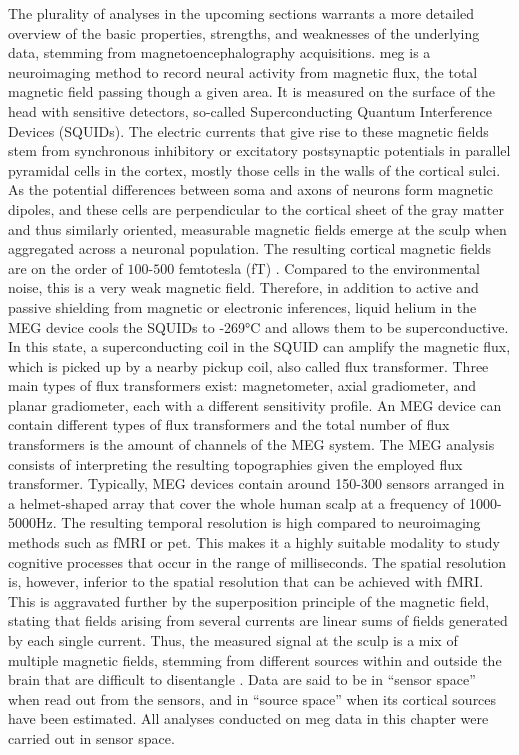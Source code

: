 The plurality of analyses in the upcoming sections warrants a more detailed overview of the basic properties, strengths, and weaknesses of the underlying data, stemming from magnetoencephalography acquisitions.
\gls{meg} is a neuroimaging method to record neural activity from magnetic flux, the total magnetic field passing though a given area.
It is measured on the surface of the head with sensitive detectors, so-called Superconducting Quantum Interference Devices (SQUIDs).
The electric currents that give rise to these magnetic fields stem from synchronous inhibitory or excitatory postsynaptic potentials in parallel pyramidal cells in the cortex, mostly those cells in the walls of the cortical sulci.
As the potential differences between soma and axons of neurons form magnetic dipoles, and these cells are perpendicular to the cortical sheet of the gray matter and thus similarly oriented, measurable magnetic fields emerge at the sculp when aggregated across a neuronal population.
The resulting cortical magnetic fields are on the order of $100$-$500$ femtotesla (fT) \citep{hari2017primer}.
Compared to the environmental noise, this is a very weak magnetic field.
Therefore, in addition to active and passive shielding from magnetic or electronic inferences, liquid helium in the MEG device cools the SQUIDs to -269°C and allows them to be superconductive.
In this state, a superconducting coil in the SQUID can amplify the magnetic flux, which is picked up by a nearby pickup coil, also called flux transformer.
Three main types of flux transformers exist: magnetometer, axial gradiometer, and planar gradiometer, each with a different sensitivity profile.
An MEG device can contain different types of flux transformers and the total number of flux transformers is the amount of channels of the MEG system.
The MEG analysis consists of interpreting the resulting topographies given the employed flux transformer.
Typically, MEG devices contain around 150-300 sensors arranged in a helmet-shaped array that cover the whole human scalp at a frequency of 1000-5000Hz.
The resulting temporal resolution is high compared to neuroimaging methods such as \gls{fMRI} or \gls{pet}.
This makes it a highly suitable modality to study cognitive processes that occur in the range of milliseconds.
The spatial resolution is, however, inferior to the spatial resolution that can be achieved with \gls{fMRI}.
This is aggravated further by the superposition principle of the magnetic field, stating that fields arising from several currents are linear sums of fields generated by each single current.
Thus, the measured signal at the sculp is a mix of multiple magnetic fields, stemming from different sources within and outside the brain that are difficult to disentangle \citep{hari2017primer}.
Data are said to be in ``sensor space'' when read out from the sensors, and in ``source space'' when its cortical sources have been estimated.
All analyses conducted on \gls{meg} data in this chapter were carried out in sensor space.



